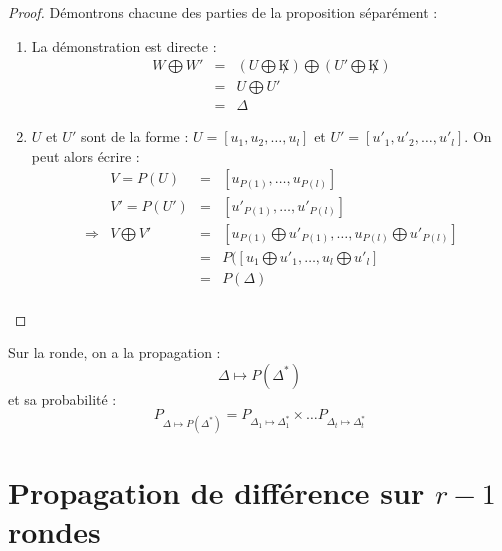 \documentclass[a4paper, 10pt]{thesis}
\begin{document}
\begin{proof} Démontrons chacune des parties de la proposition séparément :\begin{enumerate}
    \item La démonstration est directe : 
        \begin{displaymath}
            \begin{array}{rcl}
                W \bigoplus W' & = & (U \bigoplus \not K) \bigoplus (U' \bigoplus \not K) \\
                               & = & U \bigoplus U' \\
                               & = & \Delta
            \end{array}
        \end{displaymath}
    \item $U$ et $U'$ sont de la forme : $U = [u_1, u_2, \dots, u_l]$ et $U' = [u'_1, u'_2, \dots,
        u'_l]$. On peut alors écrire : 
        \begin{displaymath}
            \begin{array}{rrcl}
                & V = P(U) & = & [u_{P(1)}, \dots, u_{P(l)}] \\
                & V' = P(U') & = & [u'_{P(1)}, \dots, u'_{P(l)}] \\
                \Rightarrow & V \bigoplus V' & = & [u_{P(1)} \bigoplus u'_{P(1)}, \dots, u_{P(l)}
            \bigoplus u'_{P(l)}] \\
                & & = & P([u_1 \bigoplus u'_1, \dots, u_l \bigoplus u'_l] \\
                & & = & P(\Delta) \\
            \end{array}
        \end{displaymath}
    \end{enumerate}
\end{proof}


Sur la ronde, on a la propagation : 
\begin{displaymath}
    \Delta \mapsto P(\Delta^*)
\end{displaymath}
et sa probabilité :
\begin{displaymath}
    P_{\Delta \mapsto P(\Delta^*)} = P_{\Delta_1 \mapsto \Delta_1^*} \times \dots P_{\Delta_t
    \mapsto \Delta_t^*}
\end{displaymath}

\section{Propagation de différence sur $r - 1$ rondes}
\end{document}
